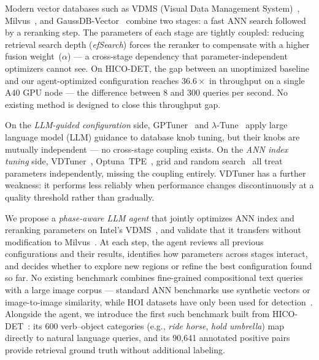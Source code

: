 \documentclass[sigconf, nonacm]{acmart}
\theoremstyle{definition}
\begin{document}
Modern vector databases such as VDMS (Visual Data Management System)~\cite{remis2021vdms},
Milvus~\cite{wang2021milvus}, and GaussDB-Vector~\cite{sun2025gaussdb} combine
two stages: a fast ANN search followed by a reranking step.
The parameters of each stage are tightly coupled: reducing retrieval search depth
(\textit{efSearch}) forces the reranker to compensate with a higher fusion
weight~($\alpha$) --- a cross-stage dependency that parameter-independent
optimizers cannot see.
On HICO-DET, the gap between an unoptimized baseline and our agent-optimized
configuration reaches $\mathbf{36.6\times}$ in throughput on a single A40 GPU
node --- the difference between 8 and 300 queries per second.
No existing method is designed to close this throughput gap.

On the \emph{LLM-guided configuration} side, GPTuner~\cite{lao2024gpttuner}
and $\lambda$-Tune~\cite{giannakouris2025lambdatune} apply large language model (LLM) guidance to
database knob tuning, but their knobs are mutually independent --- no
cross-stage coupling exists.
On the \emph{ANN index tuning} side, VDTuner~\cite{yang2024vdtuner},
Optuna~TPE~\cite{akiba2019optuna}, grid and random
search~\cite{bergstra2012random} all treat parameters independently, missing
the coupling entirely.
VDTuner has a further weakness: it performs less reliably when performance
changes discontinuously at a quality threshold rather than gradually.

We propose a \emph{phase-aware LLM agent} that jointly optimizes ANN index
and reranking parameters on Intel's VDMS~\cite{remis2021vdms}, and validate
that it transfers without modification to Milvus~\cite{wang2021milvus}.
At each step, the agent reviews all previous configurations and their results,
identifies how parameters across stages interact, and decides whether to explore
new regions or refine the best configuration found so far.
No existing benchmark combines fine-grained compositional text queries with a
large image corpus --- standard ANN benchmarks use synthetic vectors or
image-to-image similarity, while HOI datasets have only been used for
detection~\cite{kim2021hotr,zhang2021cdn,ning2023hoiclip,li2024dphoi}.
Alongside the agent, we introduce the first such benchmark built from
HICO-DET~\cite{chao2018hico}: its 600 verb--object categories
(e.g., \textit{ride horse}, \textit{hold umbrella}) map directly to
natural language queries, and its 90{,}641 annotated positive pairs provide
retrieval ground truth without additional labeling.
\end{document}
